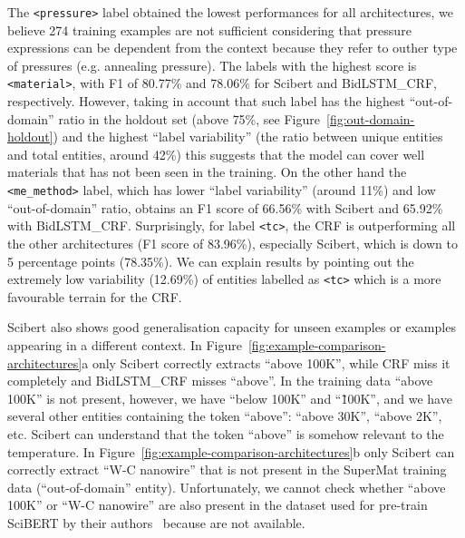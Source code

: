 \documentclass[]{interact}
\theoremstyle{plain}%
\theoremstyle{definition}
\theoremstyle{remark}
\begin{document}
The \texttt{<pressure>} label obtained the lowest performances for all architectures, we believe 274 training examples are not sufficient considering that pressure expressions can be dependent from the context because they refer to outher type of pressures (e.g. annealing pressure).
The labels with the highest score is \texttt{<material>}, with F1 of 80.77\% and 78.06\% for Scibert and BidLSTM\_CRF, respectively. However, taking in account that such label has the highest ``out-of-domain'' ratio in the holdout set (above 75\%, see Figure~\ref{fig:out-domain-holdout}) and the highest ``label variability'' (the ratio between unique entities and total entities, around 42\%) this suggests that the model can cover well materials that has not been seen in the training. 
On the other hand the \texttt{<me\_method>} label, which has lower ``label variability'' (around 11\%) and low ``out-of-domain'' ratio, obtains an F1 score of 66.56\% with Scibert and 65.92\% with BidLSTM\_CRF.
Surprisingly, for label \texttt{<tc>}, the CRF is outperforming all the other architectures (F1 score of 83.96\%), especially Scibert, which is down to 5 percentage points (78.35\%). We can explain results by pointing out the extremely low variability (12.69\%) of entities labelled as \texttt{<tc>} which is a more favourable terrain for the CRF. %

Scibert also shows good generalisation capacity for unseen examples or examples appearing in a different context. 
In Figure~\ref{fig:example-comparison-architectures}a only Scibert correctly extracts ``above 100K'', while CRF miss it completely and BidLSTM\_CRF misses ``above''. 
In the training data ``above 100K'' is not present, however, we have ``below 100K'' and ``\~100K'', and we have several other entities containing the token ``above'': ``above 30K'', ``above 2K'', etc. 
Scibert can understand that the token ``above'' is somehow relevant to the temperature. 
In Figure~\ref{fig:example-comparison-architectures}b only Scibert can correctly extract ``W-C nanowire'' that is not present in the SuperMat training data (``out-of-domain'' entity). 
Unfortunately, we cannot check whether ``above 100K'' or ``W-C nanowire'' are also present in the dataset used for pre-train SciBERT by their authors~\cite{Beltagy2019SciBERT} because are not available. 
\end{document}

